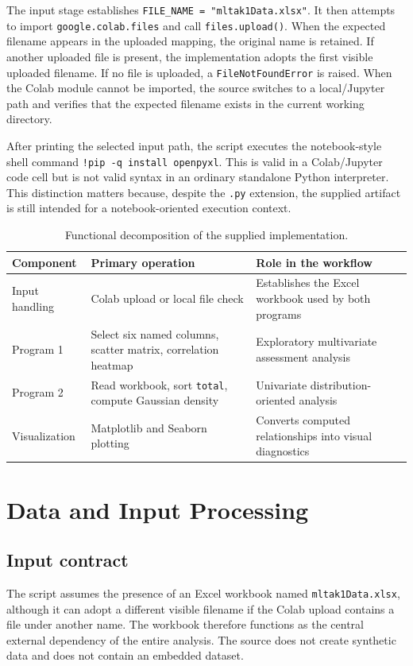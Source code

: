 \documentclass[11pt,a4paper]{article}
\begin{document}
The input stage establishes \texttt{FILE\_NAME = "mltak1Data.xlsx"}. It then attempts to import \texttt{google.colab.files} and call \texttt{files.upload()}. When the expected filename appears in the uploaded mapping, the original name is retained. If another uploaded file is present, the implementation adopts the first visible uploaded filename. If no file is uploaded, a \texttt{FileNotFoundError} is raised. When the Colab module cannot be imported, the source switches to a local/Jupyter path and verifies that the expected filename exists in the current working directory.

After printing the selected input path, the script executes the notebook-style shell command \texttt{!pip -q install openpyxl}. This is valid in a Colab/Jupyter code cell but is not valid syntax in an ordinary standalone Python interpreter. This distinction matters because, despite the \texttt{.py} extension, the supplied artifact is still intended for a notebook-oriented execution context.

\begin{table}[ht]
\centering
\small
\begin{tabular}{p{} p{} p{}}
\toprule
\textbf{Component} & \textbf{Primary operation} & \textbf{Role in the workflow}\\
\midrule
Input handling & Colab upload or local file check & Establishes the Excel workbook used by both programs \\
Program 1 & Select six named columns, scatter matrix, correlation heatmap & Exploratory multivariate assessment analysis \\
Program 2 & Read workbook, sort \texttt{total}, compute Gaussian density & Univariate distribution-oriented analysis \\
Visualization & Matplotlib and Seaborn plotting & Converts computed relationships into visual diagnostics \\
\bottomrule
\end{tabular}
\caption{Functional decomposition of the supplied implementation.}
\end{table}

\section{Data and Input Processing}
\subsection{Input contract}
The script assumes the presence of an Excel workbook named \texttt{mltak1Data.xlsx}, although it can adopt a different visible filename if the Colab upload contains a file under another name. The workbook therefore functions as the central external dependency of the entire analysis. The source does not create synthetic data and does not contain an embedded dataset.
\end{document}
